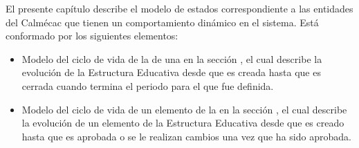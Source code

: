 El presente capítulo describe el modelo de estados correspondiente a las entidades del Calmécac que tienen un comportamiento dinámico en el sistema. Está conformado por los siguientes elementos:
\begin{itemize}
	\item Modelo del ciclo de vida de la  de una  en la sección , el cual describe la evolución de la Estructura Educativa desde que es creada hasta que es cerrada cuando termina el periodo para el que fue definida.
	
	\item Modelo del ciclo de vida de un elemento de la  en la sección , el cual describe la evolución de un elemento de la Estructura Educativa desde que es creado hasta que es aprobada o se le realizan cambios una vez que ha sido aprobada.
\end{itemize}

